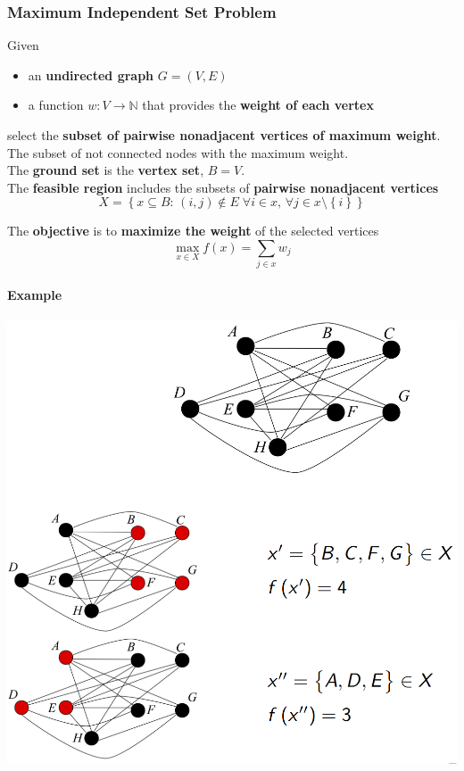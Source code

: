 \newpage

\subsubsection{Maximum Independent Set Problem}
Given
\begin{itemize}
	\item an \textbf{undirected graph} $G = (V , E )$
	\item a function $w : V \rightarrow \mathbb{N}$ that provides the \textbf{weight of each vertex}
\end{itemize}
select the \textbf{subset of pairwise nonadjacent vertices of maximum weight}.\\
The subset of not connected nodes with the maximum weight.\\

The \textbf{ground set} is the \textbf{vertex set}, $B = V$.\\

The \textbf{feasible region} includes the subsets of \textbf{pairwise nonadjacent vertices}
$$ X = \left\{x \subseteq B : \, (i,j) \notin E \; \forall i \in x, \, \forall j \in x \setminus \left\{i\right\}\right\}$$

The \textbf{objective} is to \textbf{maximize the weight} of the selected vertices
$$ \max_{x \in X} f(x) = \sum_{j \in x} w_j $$

\newpage

\paragraph{Example}
\begin{center}
	\includegraphics[width=\columnwidth]{img/MISP1}
\end{center}

